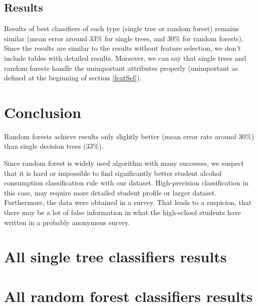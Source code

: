 \documentclass[a4paper]{article}
\begin{document}
\subsection{Results}

Results of best classifiers of each type (single tree or random forest) remains similar 
(mean error around 33\% for single trees, and 30\% for random forests).
Since the results are similar to the results without feature selection,
we don't include tables with detailed results.
Moreover, we can say that single trees and random forests handle
the unimportant attributes properly (unimportant as defined at the beginning of section \ref{featSel}).



\section{Conclusion}
Random forests achieve results only slightly better (mean error rate around 30\%)
than single decision trees (33\%).

Since random forest is widely used algorithm with many successes, we suspect
that it is hard or impossible to find significantly better
student alcohol consumption classification rule
with our dataset.
High-precision classification in this case, may require more detailed
student profile or larger dataset.
Furthermore, the data were obtained in a survey.
That leads to a suspicion, that there may be a lot of false information in
what the high-school students have written in a probably anonymous survey.





\onecolumn
\newpage
\appendix
\section{All single tree classifiers results}
% 


\newpage
\section{All random forest classifiers results}
% 

\end{document}
